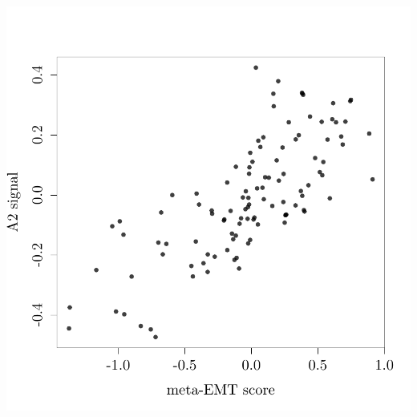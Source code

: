 \documentclass{article}\usepackage[]{graphicx}\usepackage[]{color}
\makeatletter
\def\maxwidth{ %
  \ifdim\Gin@nat@width>\linewidth
    \linewidth
  \else
    \Gin@nat@width
  \fi
}
\newenvironment{knitrout}{}{} %
\makeatother
\begin{document}
\begin{knitrout}
{\centering \includegraphics[width=\maxwidth]{figure/nmf-msigdb-cor-plots-8} 

}



\end{knitrout}
\end{document}

